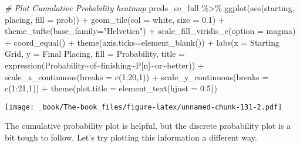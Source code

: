 \documentclass[
]{book}
\newenvironment{Shaded}{\begin{snugshade}}{\end{snugshade}}
\newcommand{\AttributeTok}[1]{\textcolor[rgb]{0.77,0.63,0.00}{#1}}
\newcommand{\CommentTok}[1]{\textcolor[rgb]{0.56,0.35,0.01}{\textit{#1}}}
\newcommand{\DecValTok}[1]{\textcolor[rgb]{0.00,0.00,0.81}{#1}}
\newcommand{\FloatTok}[1]{\textcolor[rgb]{0.00,0.00,0.81}{#1}}
\newcommand{\FunctionTok}[1]{\textcolor[rgb]{0.00,0.00,0.00}{#1}}
\newcommand{\NormalTok}[1]{#1}
\newcommand{\SpecialCharTok}[1]{\textcolor[rgb]{0.00,0.00,0.00}{#1}}
\newcommand{\StringTok}[1]{\textcolor[rgb]{0.31,0.60,0.02}{#1}}
\begin{document}
\begin{Shaded}
\begin{Highlighting}[]
\CommentTok{\# Plot Cumulative Probability heatmap }
\NormalTok{preds\_se\_full }\SpecialCharTok{\%\textgreater{}\%}
  \FunctionTok{ggplot}\NormalTok{(}\FunctionTok{aes}\NormalTok{(starting, placing, }\AttributeTok{fill =}\NormalTok{ prob)) }\SpecialCharTok{+}
  \FunctionTok{geom\_tile}\NormalTok{(}\AttributeTok{col =} \StringTok{\textquotesingle{}white\textquotesingle{}}\NormalTok{, }\AttributeTok{size =} \FloatTok{0.1}\NormalTok{) }\SpecialCharTok{+}
  \FunctionTok{theme\_tufte}\NormalTok{(}\AttributeTok{base\_family=}\StringTok{"Helvetica"}\NormalTok{) }\SpecialCharTok{+}
  \FunctionTok{scale\_fill\_viridis\_c}\NormalTok{(}\AttributeTok{option =} \StringTok{\textquotesingle{}magma\textquotesingle{}}\NormalTok{) }\SpecialCharTok{+}
  \FunctionTok{coord\_equal}\NormalTok{() }\SpecialCharTok{+}
  \FunctionTok{theme}\NormalTok{(}\AttributeTok{axis.ticks=}\FunctionTok{element\_blank}\NormalTok{()) }\SpecialCharTok{+}
  \FunctionTok{labs}\NormalTok{(}\AttributeTok{x =} \StringTok{\textquotesingle{}Starting Grid\textquotesingle{}}\NormalTok{,}
       \AttributeTok{y =} \StringTok{\textquotesingle{}Final Placing\textquotesingle{}}\NormalTok{,}
       \AttributeTok{fill =} \StringTok{\textquotesingle{}Probability\textquotesingle{}}\NormalTok{,}
       \AttributeTok{title =} \FunctionTok{expression}\NormalTok{(Probability}\SpecialCharTok{\textasciitilde{}}\NormalTok{of}\SpecialCharTok{\textasciitilde{}}\NormalTok{finishing}\SpecialCharTok{\textasciitilde{}}\NormalTok{P[n]}\SpecialCharTok{\textasciitilde{}}\NormalTok{or}\SpecialCharTok{\textasciitilde{}}\NormalTok{better)) }\SpecialCharTok{+}
  \FunctionTok{scale\_x\_continuous}\NormalTok{(}\AttributeTok{breaks =} \FunctionTok{c}\NormalTok{(}\DecValTok{1}\SpecialCharTok{:}\DecValTok{20}\NormalTok{,}\DecValTok{1}\NormalTok{)) }\SpecialCharTok{+}
  \FunctionTok{scale\_y\_continuous}\NormalTok{(}\AttributeTok{breaks =} \FunctionTok{c}\NormalTok{(}\DecValTok{1}\SpecialCharTok{:}\DecValTok{21}\NormalTok{,}\DecValTok{1}\NormalTok{)) }\SpecialCharTok{+}
  \FunctionTok{theme}\NormalTok{(}\AttributeTok{plot.title =} \FunctionTok{element\_text}\NormalTok{(}\AttributeTok{hjust =} \FloatTok{0.5}\NormalTok{))}
\end{Highlighting}
\end{Shaded}

\texttt{[image: \_book/The-book\_files/figure-latex/unnamed-chunk-131-2.pdf]}

The cumulative probability plot is helpful, but the discrete probability plot is a bit tough to follow. Let's try plotting this information a different way.
\end{document}
